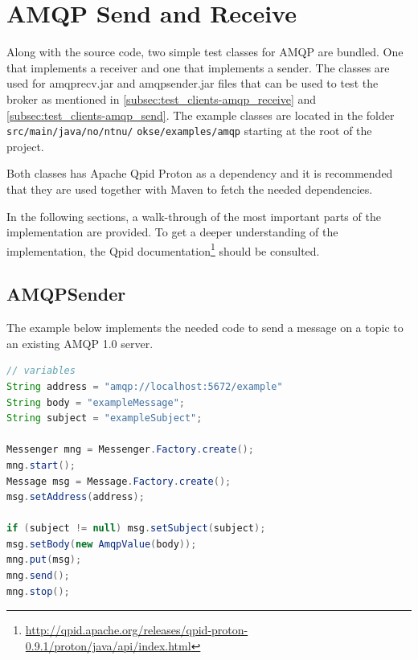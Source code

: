 \section{AMQP Send and Receive}
Along with the source code, two simple test classes for AMQP are bundled. One that implements a receiver and one that implements a sender. The classes are used for amqprecv.jar and amqpsender.jar files that can be used to test the broker as mentioned in \ref{subsec:test_clients-amqp_receive} and \ref{subsec:test_clients-amqp_send}. The example classes are located in the folder \verb!src/main/java/no/ntnu/! \verb!okse/examples/amqp! starting at the root of the project.

Both classes has Apache Qpid Proton as a dependency and it is recommended that they are used together with Maven to fetch the needed dependencies.

In the following sections, a walk-through of the most important parts of the implementation are provided. To get a deeper understanding of the implementation, the Qpid documentation\footnote{\url{http://qpid.apache.org/releases/qpid-proton-0.9.1/proton/java/api/index.html}} should be consulted.

\subsection{AMQPSender}
The example below implements the needed code to send a message on a topic to an existing AMQP 1.0 server.

\begin{lstlisting}[language=Java, captionpos=b, caption=Example use of Messenger to subscribe, frame=bt, showstringspaces=false,label={lst:AMQPSender}]
// variables
String address = "amqp://localhost:5672/example"
String body = "exampleMessage";
String subject = "exampleSubject";

Messenger mng = Messenger.Factory.create();
mng.start();
Message msg = Message.Factory.create();
msg.setAddress(address);

if (subject != null) msg.setSubject(subject);
msg.setBody(new AmqpValue(body));
mng.put(msg);
mng.send();
mng.stop();
\end{lstlisting}

